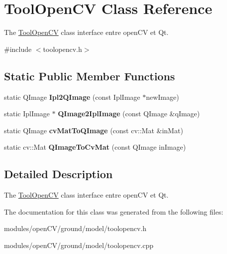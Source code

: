 \hypertarget{classToolOpenCV}{\section{Tool\-Open\-C\-V Class Reference}
\label{classToolOpenCV}
}


The \hyperlink{classToolOpenCV}{Tool\-Open\-C\-V} class interface entre open\-C\-V et Qt.  




{\ttfamily \#include $<$toolopencv.\-h$>$}

\subsection*{Static Public Member Functions}
\begin{DoxyCompactItemize}
\item 
\hypertarget{classToolOpenCV_a908d7f1eb5ff4f8d44e8fdb822929dc4}{static Q\-Image {\bfseries Ipl2\-Q\-Image} (const Ipl\-Image $\ast$new\-Image)}\label{classToolOpenCV_a908d7f1eb5ff4f8d44e8fdb822929dc4}

\item 
\hypertarget{classToolOpenCV_ab1717ea9b402411b3ac30f3ed8b80075}{static Ipl\-Image $\ast$ {\bfseries Q\-Image2\-Ipl\-Image} (const Q\-Image \&q\-Image)}\label{classToolOpenCV_ab1717ea9b402411b3ac30f3ed8b80075}

\item 
\hypertarget{classToolOpenCV_a5abd7ac7b7fbf8054bbd732693d2cf7b}{static Q\-Image {\bfseries cv\-Mat\-To\-Q\-Image} (const cv\-::\-Mat \&in\-Mat)}\label{classToolOpenCV_a5abd7ac7b7fbf8054bbd732693d2cf7b}

\item 
\hypertarget{classToolOpenCV_ae0bded3d58ff8e333b40dfe5b527c25b}{static cv\-::\-Mat {\bfseries Q\-Image\-To\-Cv\-Mat} (const Q\-Image in\-Image)}\label{classToolOpenCV_ae0bded3d58ff8e333b40dfe5b527c25b}

\end{DoxyCompactItemize}


\subsection{Detailed Description}
The \hyperlink{classToolOpenCV}{Tool\-Open\-C\-V} class interface entre open\-C\-V et Qt. 

The documentation for this class was generated from the following files\-:\begin{DoxyCompactItemize}
\item 
modules/open\-C\-V/ground/model/toolopencv.\-h\item 
modules/open\-C\-V/ground/model/toolopencv.\-cpp\end{DoxyCompactItemize}
